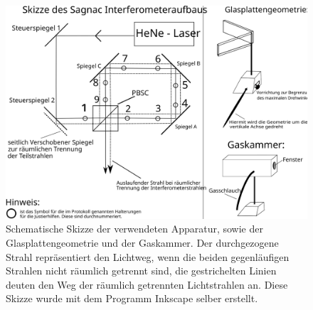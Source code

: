 \begin{figure}[]
  \centering
  \includegraphics[width=1\textwidth]{figures/bauteile}
  \caption{Schematische Skizze der verwendeten Apparatur, sowie der 
   Glasplattengeometrie und der Gaskammer. Der durchgezogene Strahl 
    repräsentiert den Lichtweg, wenn die beiden gegenläufigen 
    Strahlen nicht räumlich getrennt sind, die gestrichelten Linien 
     deuten den Weg der räumlich getrennten Lichtstrahlen an.
    Diese Skizze wurde mit 
    dem Programm Inkscape selber erstellt.}
  \label{fig:bauteile}
\end{figure}
%
